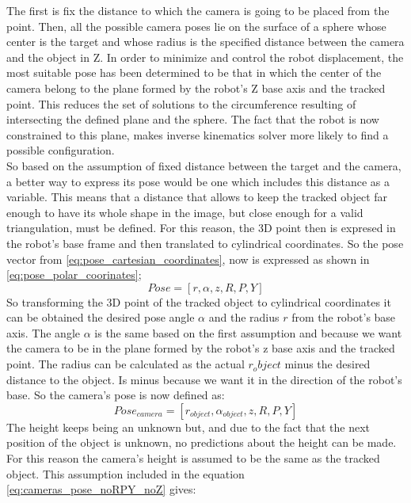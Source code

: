 	The first is fix the distance to which the camera is going to be placed from the point. Then, all the possible camera poses lie on the surface of a sphere whose center is the target and whose radius is the specified distance between the camera and the object in Z.
	In order to minimize and control the robot displacement, the most suitable pose has been determined to be that in which the center of the camera belong to the plane formed by the robot's Z base axis and the tracked point. 
	This reduces the set of solutions to the circumference resulting of intersecting the defined plane and the sphere.
	The fact that the robot is now constrained to this plane, makes inverse kinematics solver more likely to find a possible configuration.\\

	So based on the assumption of fixed distance between the target and the camera, a better way to express its pose would be one which includes this distance as a variable.  
	This means that a distance that allows to keep the tracked object far enough to have its whole shape in the image, but close enough for a valid triangulation, must be defined.
	For this reason, the 3D point then is expresed in the robot's base frame and then translated to cylindrical coordinates. So the pose vector from \ref{eq:pose_cartesian_coordinates}, now is expressed as shown in \ref{eq:pose_polar_coorinates};
		\begin{equation}
		\label{eq:pose_polar_coorinates}
			Pose = [r,\alpha,z,R,P,Y]
		\end{equation}
	So transforming the 3D point of the tracked object to cylindrical coordinates it can be obtained the desired pose angle $\alpha$ and the radius $r$ from the robot's base axis. 
	The angle $\alpha$ is the same based on the first assumption and because we want the camera to be in the plane formed by the robot's z base axis and the tracked point. 
	The radius can be calculated as the actual $r_object$ minus the desired distance to the object. Is minus because we want it in the direction of the robot's base. 
	So the camera's pose is now defined as:
		\begin{equation}
		\label{eq:cameras_pose_noRPY_noZ}
			Pose_{camera} = [r_{object},\alpha_{object},z,R,P,Y]
		\end{equation}
	The height keeps being an unknown but, and due to the fact that the next position of the object is unknown, no predictions about the height can be made. 
	For this reason the camera's height is assumed to be the same as the tracked object. This assumption included in the equation \ref{eq:cameras_pose_noRPY_noZ} gives:
